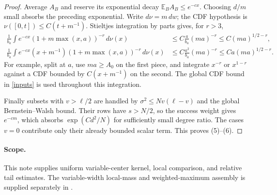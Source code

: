 \documentclass[11pt]{article}
\newcommand{\E}{\mathbb E}
\begin{document}
\begin{proof}
Average $A_B$ and reserve its exponential decay
$\E_BA_B\le e^{-c x}$. Choosing $d/m$ small absorbs the preceding
exponential. Write $d\nu=m\,dw$; the CDF hypothesis is
$\nu([0,t])\le C(t+m^{-1})$. Stieltjes integration by parts gives,
for $r>3$,
\begin{align*}
 \frac1{b_a}\int e^{-cx}(1+m\max(x,a))^{-r}\,d\nu(x)
      &\le C\frac a{b_a}(ma)^{-r}
        \le C(ma)^{1/2-r},\\
 \frac1{b_a}\int e^{-cx}(x+m^{-1})
                    (1+m\max(x,a))^{-r}\,d\nu(x)
      &\le C\frac{a^2}{b_a}(ma)^{-r}
        \le C a(ma)^{1/2-r}.
\end{align*}
For example, split at $a$, use $ma\ge A_0$ on the first piece,
and integrate $x^{-r}$ or $x^{1-r}$ against a CDF bounded by
$C(x+m^{-1})$ on the second. The global CDF bound in
\eqref{inputs} is used throughout this integration.

Finally subsets with $v>\ell/2$ are handled by
$\sigma^2\le Nv(\ell-v)$ and the global Bernstein--Walsh bound.
Their rows have $s>N/2$, so the success weight gives $e^{-cm}$,
which absorbs $\exp(Cd^2/N)$ for sufficiently small degree ratio.
The cases $v=0$ contribute only their already bounded scalar term.
This proves (5)--(6).
\end{proof}

\paragraph{Scope.}
This note supplies uniform variable-center kernel, local comparison,
and relative tail estimates. The variable-width local-mass and
weighted-maximum assembly is supplied separately in
.
\end{document}
